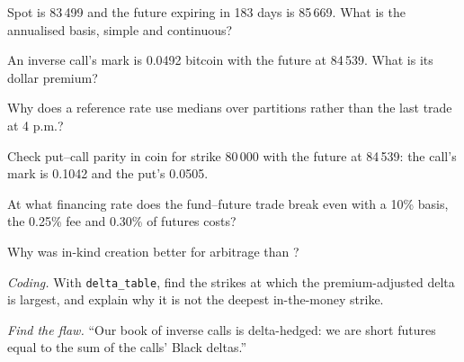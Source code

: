 \begin{exercise}[$\star$]\label{exo:m3:dated-futures-options-and-etfs:1}
Spot is 83\,499 and the future expiring in 183 days is 85\,669. What is the annualised basis, simple and continuous?
\end{exercise}

\begin{exercise}[$\star$]\label{exo:m3:dated-futures-options-and-etfs:2}
An inverse call's mark is 0.0492 bitcoin with the future at 84\,539. What is its dollar premium?
\end{exercise}

\begin{exercise}[$\star$]\label{exo:m3:dated-futures-options-and-etfs:3}
Why does a reference rate use medians over partitions rather than the last trade at 4 p.m.?
\end{exercise}

\begin{exercise}[$\star\star$]\label{exo:m3:dated-futures-options-and-etfs:4}
Check put--call parity in coin for strike 80\,000 with the future at 84\,539: the call's mark is 0.1042 and the put's 0.0505.
\end{exercise}

\begin{exercise}[$\star\star$]\label{exo:m3:dated-futures-options-and-etfs:5}
At what financing rate does the fund--future trade break even with a 10\% basis, the 0.25\% fee and 0.30\% of futures costs?
\end{exercise}

\begin{exercise}[$\star\star$]\label{exo:m3:dated-futures-options-and-etfs:6}
Why was in-kind creation better for arbitrage than ?
\end{exercise}

\begin{exercise}[$\star\star\star$]\label{exo:m3:dated-futures-options-and-etfs:7}
\emph{Coding.} With \texttt{delta\_table}, find the strikes at which the premium-adjusted delta is largest, and explain why it is not the
deepest in-the-money strike.
\end{exercise}

\begin{exercise}[$\star\star\star$]\label{exo:m3:dated-futures-options-and-etfs:8}
\emph{Find the flaw.} ``Our book of inverse calls is delta-hedged: we are short futures equal to the sum of the calls' Black deltas.''
\end{exercise}

